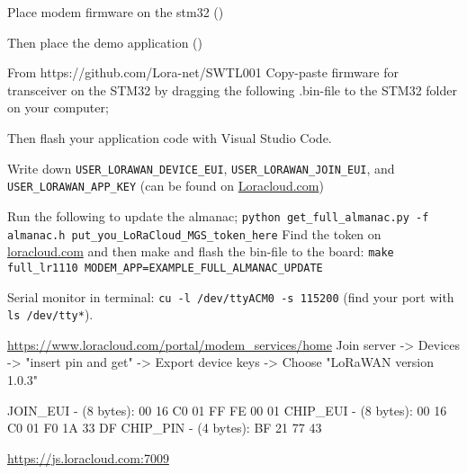 Place modem firmware on the stm32 ()


Then place the demo application ()


From https://github.com/Lora-net/SWTL001
Copy-paste firmware for transceiver on the STM32 by dragging the following .bin-file to the STM32 folder on your computer; 

Then flash your application code with Visual Studio Code.


Write down \lstinline[style=bash]{USER_LORAWAN_DEVICE_EUI}, \lstinline[style=bash]{USER_LORAWAN_JOIN_EUI}, and \lstinline[style=bash]{USER_LORAWAN_APP_KEY} (can be found on \url{Loracloud.com})

Run the following to update the almanac; \lstinline[style=python]{python get_full_almanac.py -f almanac.h put_you_LoRaCloud_MGS_token_here}
Find the token on \url{loracloud.com}
and then make and flash the bin-file to the board: \lstinline[style=bash]{make full_lr1110 MODEM_APP=EXAMPLE_FULL_ALMANAC_UPDATE}



Serial monitor in terminal: \lstinline[style=bash]{cu -l /dev/ttyACM0 -s 115200} (find your port with \lstinline[style=bash]{ls /dev/tty*}).

\url{https://www.loracloud.com/portal/modem_services/home}
Join server -> Devices -> "insert pin and get" -> Export device keys -> Choose "LoRaWAN version 1.0.3"


JOIN\_EUI - (8 bytes):
 00 16 C0 01 FF FE 00 01
CHIP\_EUI - (8 bytes):
 00 16 C0 01 F0 1A 33 DF
CHIP\_PIN - (4 bytes):
 BF 21 77 43
 
 
\url{https://js.loracloud.com:7009}